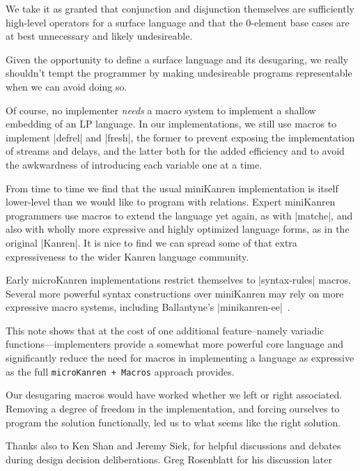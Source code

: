 \documentclass[sigplan,screen,draft,anonymous,review,natbib=false]{acmart}
\begin{document}
We take it as granted that conjunction and disjunction themselves are
sufficiently high-level operators for a surface language and that the
0-element base cases are at best unnecessary and likely undesireable.

Given the opportunity to define a surface language and its desugaring,
we really shouldn't tempt the programmer by making undesireable
programs representable when we can avoid doing so.

Of course, no implementer \emph{needs} a macro system to implement a
shallow embedding of an LP language. In our implementations, we still
use macros to implement \rackinline|defrel| and \rackinline|fresh|,
the former to prevent exposing the implementation of streams and
delays, and the latter both for the added efficiency and to avoid the
awkwardness of introducing each variable one at a time.

From time to time we find that the usual miniKanren implementation is
itself lower-level than we would like to program with relations.
Expert miniKanren programmers use macros to extend the language yet
again, as with \rackinline|matche|, and also with wholly more
expressive and highly optimized language forms, as in the original
\rackinline|Kanren|. It is nice to find we can spread some of that
extra expressiveness to the wider Kanren language community.

Early microKanren implementations restrict themselves to
\rackinline|syntax-rules| macros. Several more powerful syntax
constructions over miniKanren may rely on more expressive macro
systems, including Ballantyne's
\rackinline|minikanren-ee|~\cite{ballantyne2020macros}.

This note shows that at the cost of one additional feature--namely
variadic functions---implementers provide a somewhat more powerful
core language and significantly reduce the need for macros in
implementing a language as expressive as the full
\verb|microKanren + Macros| approach provides.

Our desugaring macros would have worked whether we left or right
associated. Removing a degree of freedom in the implementation, and
forcing ourselves to program the solution functionally, led us to what
seems like the right solution.

\begin{acks}

  Thanks also to Ken Shan and Jeremy Siek, for helpful discussions and
  debates during design decision deliberations. Greg Rosenblatt for
  his discussion later

\end{acks}

\printbibliography{}
\end{document}

